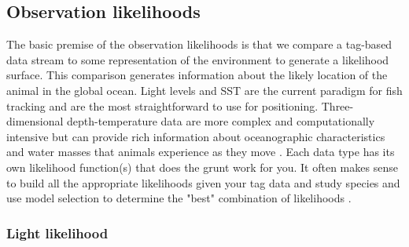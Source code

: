 \documentclass{article}\usepackage[]{graphicx}\usepackage[]{color}
\newcommand{\eg}{\textit{e.g.} }
\begin{document}
\subsection{Observation likelihoods} \label{sec:lik}

The basic premise of the observation likelihoods is that we compare a tag-based data stream to some representation of the environment to generate a likelihood surface. This comparison generates information about the likely location of the animal in the global ocean. Light levels and SST are the current paradigm for fish tracking and are the most straightforward to use for positioning. Three-dimensional depth-temperature data are more complex and computationally intensive but can provide rich information about oceanographic characteristics and water masses that animals experience as they move \citep[\eg][]{Braun2018b}. Each data type has its own likelihood function(s) that does the grunt work for you. It often makes sense to build all the appropriate likelihoods given your tag data and study species and use model selection to determine the "best" combination of likelihoods \citep[for example, see][and section \ref{sec:multiple}]{Braun2018a}.

\subsubsection{Light likelihood}
\end{document}
